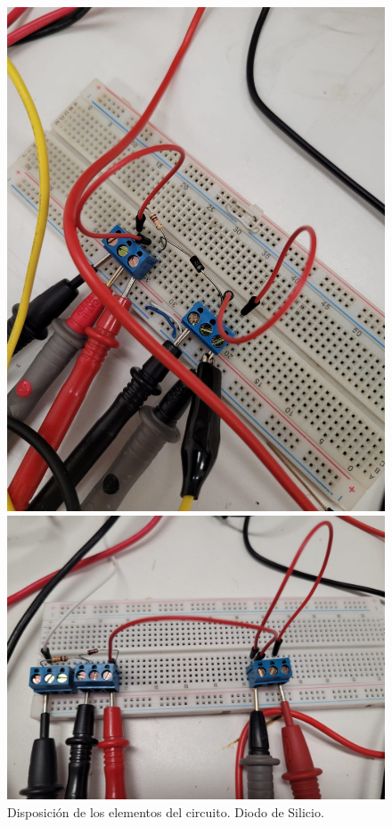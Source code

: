 \documentclass[chaptersright]{informeutn}
\begin{document}
      \begin{figure}[H]
        \centering
        \begin{minipage}{0.40\textwidth}
            \centering
            \includegraphics[width=\textwidth]{pictures/disposicion-circuito-silicio.jpeg}
            \caption{Disposición de los elementos del circuito. Diodo de Silicio.}
            \label{fig:silicio}
        \end{minipage}
        \hspace{0.05\textwidth} %
        \begin{minipage}{0.5\textwidth}
            \centering
            \includegraphics[width=\textwidth]{pictures/disposicion-circuito-germanio.jpeg}

\end{minipage}
\end{figure}
\end{document}
